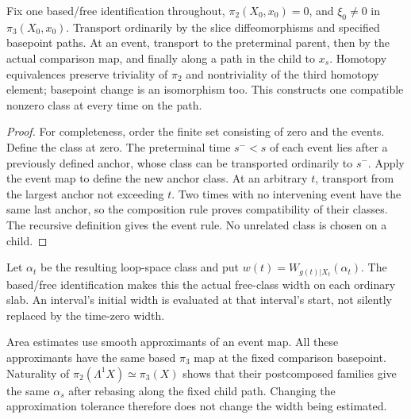 \begin{proposition}
\label{prop:v4-class-transport}
Fix one based/free identification throughout, $\pi_2(X_0,x_0)=0$,
and $\xi_0\ne0$ in $\pi_3(X_0,x_0)$. Transport ordinarily by the slice
diffeomorphisms and specified basepoint paths. At an event, transport to
the preterminal parent, then by the actual comparison map, and finally
along a path in the child to $x_s$. Homotopy equivalences preserve
triviality of $\pi_2$ and nontriviality of the third homotopy element;
basepoint change is an isomorphism too.
This constructs one compatible nonzero class at every time on the path.
\end{proposition}

\begin{proof}
For completeness, order the finite set consisting of zero and the events.
Define the class at zero. The preterminal time $s^-<s$ of each event
lies after a previously defined anchor, whose class can be transported
ordinarily to $s^-$. Apply the event map to define the new anchor class.
At an arbitrary $t$, transport from the largest anchor not exceeding
$t$. Two times with no intervening event have the same last anchor, so
the composition rule proves compatibility of their classes. The recursive
definition gives the event rule. No unrelated class is chosen on a child.
\end{proof}

Let $\alpha_t$ be the resulting loop-space class and put
$w(t)=W_{g(t)|X_t}(\alpha_t)$. The based/free identification makes this
the actual free-class width on each ordinary slab. An interval's initial
width is evaluated at that interval's start, not silently replaced by
the time-zero width.

\begin{lemma}
\label{lem:v4-event-class}
Area estimates use smooth approximants of an event map. All these
approximants have the same based $\pi_3$ map at the fixed comparison
basepoint. Naturality of $\pi_2(\Lambda^1X)\simeq\pi_3(X)$ shows that
their postcomposed families give the same $\alpha_s$ after rebasing
along the fixed child path. Changing the approximation tolerance therefore
does not change the width being estimated.
\end{lemma}

